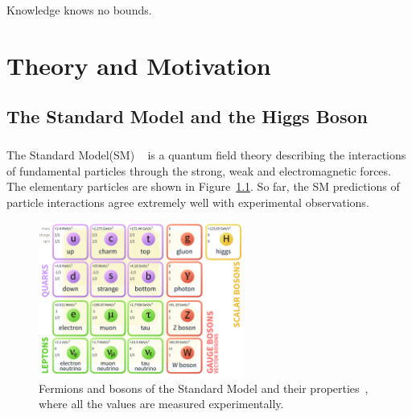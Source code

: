 \begin{savequote}[75mm]
Knowledge knows no bounds.
\end{savequote}

\chapter{Theory and Motivation}

\section{The Standard Model and the Higgs Boson}
\paragraph{}
The Standard Model(SM) ~\cite{Pdg,Griffiths,Tully,Schwartz} is a quantum field theory describing the interactions of fundamental particles through the strong, weak and electromagnetic forces. The elementary particles are shown in Figure~\ref{fig:SM}. So far, the SM predictions of particle interactions agree extremely well with experimental observations.

\begin{figure}[htbp!]
  \centering
  \captionsetup{justification=centering}
  \includegraphics[width=0.6\textwidth]{figures/theory/SM}
  \caption{Fermions and bosons of the Standard Model and their properties~\cite{Pdg}, where all the values are measured experimentally.}
  \label{fig:SM}
\end{figure}

